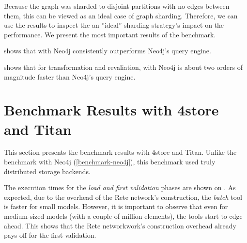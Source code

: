 Because the graph was sharded to disjoint partitions with no edges between them, this can be viewed as an ideal case of graph sharding. Therefore, we can use the results to inspect the an ''ideal'' sharding strategy's impact on the performance. We present the most important results of the benchmark.


 shows that \iqd{} with Neo4j consistently outperforms Neo4j's query engine.


 shows that for transformation and revaliation, \iqd{} with Neo4j is about two orders of magnitude faster than Neo4j's query engine.


\section{Benchmark Results with 4store and Titan}
\label{evaluation-results}

This section presents the benchmark results with 4store and Titan. Unlike the benchmark with Neo4j (\autoref{benchmark-neo4j}), this benchmark used truly distributed storage backends.



The execution times for the \emph{load and first validation} phases are shown on .
As expected, due to the overhead of the Rete network's construction, the \emph{batch} tool is faster for small models. However, it is important to observe that even for medium-sized models (with a couple of million elements), the \iqd{} tools start to edge ahead. This shows that the Rete networkwork's construction overhead already pays off for the first validation.

